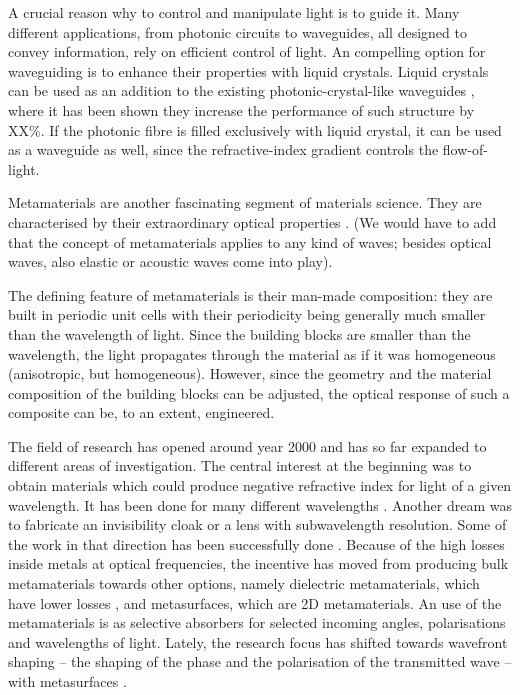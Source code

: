 \documentclass[a4paper,11pt]{article}
\begin{document}
A crucial reason why to control and manipulate light is to guide it. 
Many different applications, from photonic circuits to waveguides, all designed to convey information, rely on efficient control of light. 
An compelling option for waveguiding is to enhance their properties with liquid crystals. 
Liquid crystals can be used as an addition to the existing photonic-crystal-like waveguides \cite{dd}, where it has been shown they increase the performance of such structure by XX\%. 
If the photonic fibre is filled exclusively with liquid crystal, it can be used as a waveguide as well, since the refractive-index gradient controls the flow-of-light. 





Metamaterials are another fascinating segment of materials science. 
They are characterised by their extraordinary optical properties \cite{gja}.
(We would have to add that the concept of metamaterials applies to any kind of waves; besides optical waves, also elastic or acoustic waves come into play). 

The defining feature of metamaterials is their man-made composition: they are built in periodic unit cells with their periodicity being generally much smaller than the wavelength of light. 
Since the building blocks are smaller than the wavelength, the light propagates through the material as if it was homogeneous (anisotropic, but homogeneous). 
However, since the geometry and the material composition of the building blocks can be adjusted, the optical response of such a composite can be, to an extent, engineered. 

The field of research has opened around year 2000 \cite{koak} and has so far expanded to different areas of investigation. 
The central interest at the beginning was to obtain materials which could produce negative refractive index for light of a given wavelength. 
It has been done for many different wavelengths \cite{pwqo}. 
Another dream was to fabricate an invisibility cloak or a lens with subwavelength resolution. 
Some of the work in that direction has been successfully done \cite{lal, ei}. 
Because of the high losses inside metals at optical frequencies, the incentive has moved from producing bulk metamaterials towards other options, namely dielectric metamaterials, which have lower losses \cite{}, and metasurfaces, which are 2D metamaterials. 
An use of the metamaterials is as selective absorbers for selected incoming angles, polarisations and wavelengths of light. 
Lately, the research focus has shifted towards wavefront shaping -- the shaping of the phase and the polarisation of the transmitted wave -- with metasurfaces \cite{}.  
\end{document}
